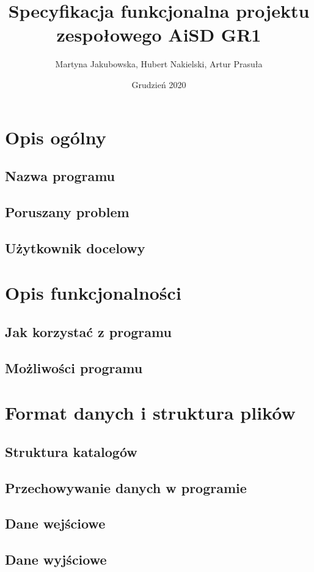 \documentclass[]{article}
\title{Specyfikacja funkcjonalna projektu zespołowego \textbf{AiSD GR1}}
\author{Martyna Jakubowska, Hubert Nakielski, Artur Prasuła}
\date{Grudzień 2020}
\begin{document}
\maketitle


\section{Opis ogólny}
\subsection{Nazwa programu} %
\subsection{Poruszany problem} %
\subsection{Użytkownik docelowy} %


\section{Opis funkcjonalności}
\subsection{Jak korzystać z programu} %
\subsection{Możliwości programu} %


\section{Format danych i struktura plików}
\subsection{Struktura katalogów} %
\subsection{Przechowywanie danych w programie} %
\subsection{Dane wejściowe} %
\subsection{Dane wyjściowe} %
\end{document}
